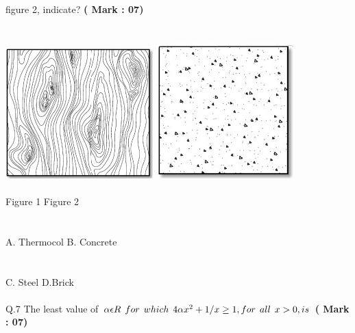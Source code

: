 \documentclass[10pt]{article}
\begin{document}
 figure 2, indicate? \tab \hspace{40ex}\textbf{( Mark : 07)}\\ \\
 \\
\hspace*{10ex}\includegraphics[width=0.40\linewidth]{q6_fig1.jpg}
\hspace*{4ex}\includegraphics[width=0.36\linewidth]{q6_fig2.jpg} \\ \\
\hspace*{25ex} Figure 1 \tab \hspace*{15ex} Figure 2
 \\ 
\\
%
\\
\hspace*{4ex}A. Thermocol \tab B. Concrete 
 \\ \\ \\
\hspace*{4ex}C. Steel   \tab D.Brick 
\\ \\
Q.7   The least value of $ \alpha\epsilon R \hspace*{1ex}  for \hspace*{1ex} which \hspace*{1ex} 4\alpha x^2 + 1/x\ge 1, for \hspace*{1ex} all \hspace*{1ex} x>0, is $ \hspace{20ex}\textbf{( Mark : 07)} \\
\end{document}
